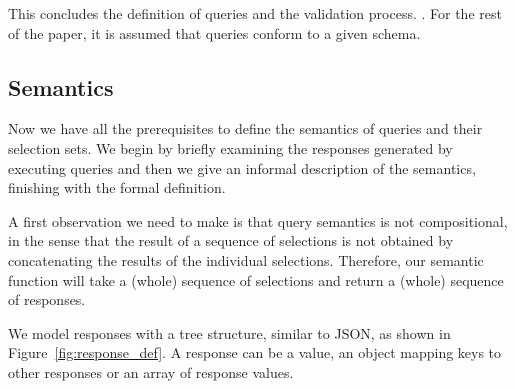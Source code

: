 

This concludes the definition of \gql queries and the validation process. . For the rest of the paper, it is assumed that queries conform to a given schema. 

\subsection{Semantics}\label{subsec:semantics}
Now we have all the prerequisites to define the semantics of \gql queries and their selection sets. We begin by briefly examining the responses generated by executing queries and then we give an informal description of the semantics, finishing with the formal definition. %

A first observation we need to make is that query semantics is not compositional, in the sense that the result of a sequence of selections is not obtained by concatenating the results of the individual selections. Therefore, our semantic function will take a (whole) sequence of selections and return a (whole) sequence of responses.  

We model responses with a tree structure, similar to JSON, as shown in Figure~\ref{fig:response_def}. A response can be a value, an object mapping keys to other responses or an array of response values.


